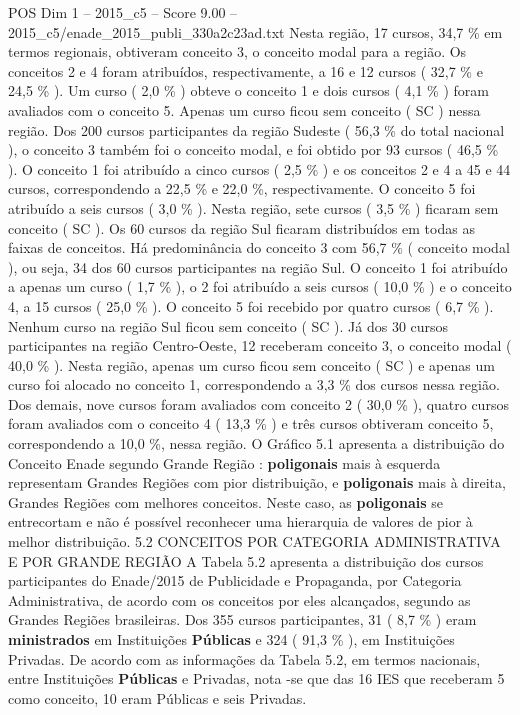 \begin{textsample}{POS Dim 1 – 2015\_c5 – Score 9.00 – 2015\_c5/enade\_2015\_publi\_330a2c23ad.txt}
Nesta região, 17 cursos, 34,7 \% em termos regionais, obtiveram conceito 3, o conceito modal para a região.
Os conceitos 2 e 4 foram atribuídos, respectivamente, a 16 e 12 cursos ( 32,7 \% e 24,5 \% ).
Um curso ( 2,0 \% ) obteve o conceito 1 e dois cursos ( 4,1 \% ) foram avaliados com o conceito 5.
Apenas um curso ficou sem conceito ( SC ) nessa região.
Dos 200 cursos participantes da região Sudeste ( 56,3 \% do total nacional ), o conceito 3 também foi o conceito modal, e foi obtido por 93 cursos ( 46,5 \% ).
O conceito 1 foi atribuído a cinco cursos ( 2,5 \% ) e os conceitos 2 e 4 a 45 e 44 cursos, correspondendo a 22,5 \% e 22,0 \%, respectivamente.
O conceito 5 foi atribuído a seis cursos ( 3,0 \% ).
Nesta região, sete cursos ( 3,5 \% ) ficaram sem conceito ( SC ).
Os 60 cursos da região Sul ficaram distribuídos em todas as faixas de conceitos.
Há predominância do conceito 3 com 56,7 \% ( conceito modal ), ou seja, 34 dos 60 cursos participantes na região Sul.
O conceito 1 foi atribuído a apenas um curso ( 1,7 \% ), o 2 foi atribuído a seis cursos ( 10,0 \% ) e o conceito 4, a 15 cursos ( 25,0 \% ).
O conceito 5 foi recebido por quatro cursos ( 6,7 \% ).
Nenhum curso na região Sul ficou sem conceito ( SC ).
Já dos 30 cursos participantes na região Centro-Oeste, 12 receberam conceito 3, o conceito modal ( 40,0 \% ).
Nesta região, apenas um curso ficou sem conceito ( SC ) e apenas um curso foi alocado no conceito 1, correspondendo a 3,3 \% dos cursos nessa região.
Dos demais, nove cursos foram avaliados com conceito 2 ( 30,0 \% ), quatro cursos foram avaliados com o conceito 4 ( 13,3 \% ) e três cursos obtiveram conceito 5, correspondendo a 10,0 \%, nessa região.
O Gráfico 5.1 apresenta a distribuição do Conceito Enade segundo Grande Região : \textbf{poligonais} mais à esquerda representam Grandes Regiões com pior distribuição, e \textbf{poligonais} mais à direita, Grandes Regiões com melhores conceitos.
Neste caso, as \textbf{poligonais} se entrecortam e não é possível reconhecer uma hierarquia de valores de pior à melhor distribuição. 5.2 CONCEITOS POR CATEGORIA ADMINISTRATIVA E POR GRANDE REGIÃO A Tabela 5.2 apresenta a distribuição dos cursos participantes do Enade/2015 de Publicidade e Propaganda, por Categoria Administrativa, de acordo com os conceitos por eles alcançados, segundo as Grandes Regiões brasileiras.
Dos 355 cursos participantes, 31 ( 8,7 \% ) eram \textbf{ministrados} em Instituições \textbf{Públicas} e 324 ( 91,3 \% ), em Instituições Privadas.
De acordo com as informações da Tabela 5.2, em termos nacionais, entre Instituições \textbf{Públicas} e Privadas, nota -se que das 16 IES que receberam 5 como conceito, 10 eram Públicas e seis Privadas.

\end{textsample}
